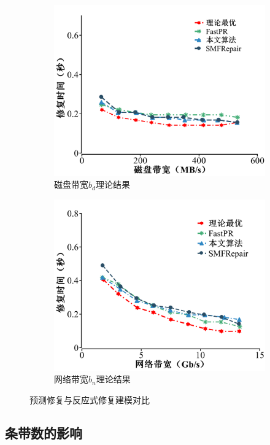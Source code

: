 \begin{figure}[htbp]
\begin{subfigure}[t]{0.4\textwidth}
		\includegraphics[width=1.1\linewidth]{figures/3-10.pdf}
		\caption{磁盘带宽$b_d$理论结果}
		\label{fig:3-10}
	\end{subfigure}
	\begin{subfigure}[t]{0.4\textwidth}
		\centering
		\includegraphics[width=1.1\linewidth]{figures/3-11.pdf}
		\caption{网络带宽$b_n$理论结果}
		\label{fig:3-11}
	\end{subfigure}
	\caption{预测修复与反应式修复建模对比}
	\label{fig:3-8-11}
\end{figure}


\subsection{条带数的影响}

